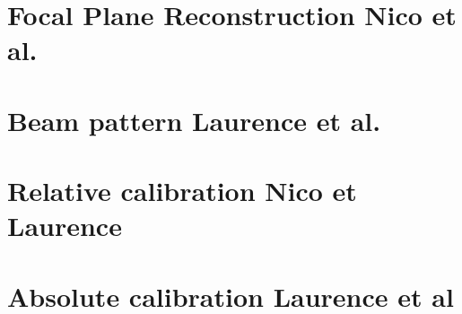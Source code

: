\documentclass[a4paper, 11pt]{report}
\begin{document}
\clearpage
\chapter{Focal Plane Reconstruction {\color{blue} Nico et al. }}
\label{se:fp_reconstruction}



\clearpage
\chapter{Beam pattern {\color{blue} Laurence et al.} }
\label{se:beams}





\clearpage
\chapter{Relative calibration {\color{blue} Nico et Laurence} }
\label{se:flat_field}




\clearpage
\chapter{Absolute calibration {\color{blue} Laurence et al}}
\label{se:calibration}


\label{se:cal_HA}



\label{se:ref_flux_primaries}
\end{document}

